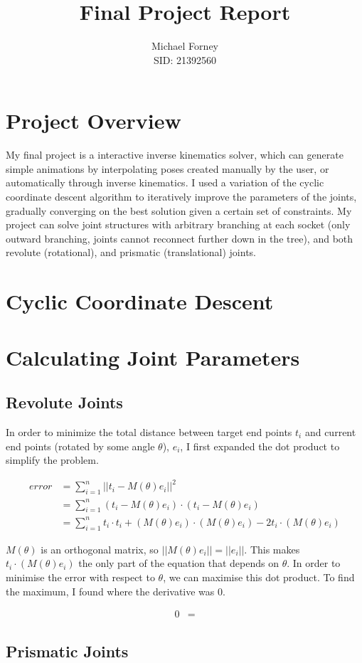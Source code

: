 \documentclass{article}
\title{Final Project Report}
\author{Michael Forney \\ SID: 21392560}
\begin{document}
    \maketitle
    \doublespacing

    \section{Project Overview}
    My final project is a interactive inverse kinematics solver, which can
    generate simple animations by interpolating poses created manually by the
    user, or automatically through inverse kinematics. I used a variation of the
    cyclic coordinate descent algorithm to iteratively improve the parameters of
    the joints, gradually converging on the best solution given a certain set of
    constraints. My project can solve joint structures with arbitrary branching
    at each socket (only outward branching, joints cannot reconnect further down
    in the tree), and both revolute (rotational), and prismatic (translational)
    joints.

    \section{Cyclic Coordinate Descent}

    \section{Calculating Joint Parameters}

    \subsection{Revolute Joints}
    In order to minimize the total distance between target end points $t_i$
    and current end points (rotated by some angle $\theta$), $e_i$, I first
    expanded the dot product to simplify the problem.

    \begin{align}
        error &= \sum_{i=1}^n ||t_i - M(\theta) e_i||^2 \\
              &= \sum_{i=1}^n (t_i - M(\theta) e_i) \cdot (t_i - M(\theta) e_i) \\
              &= \sum_{i=1}^n t_i \cdot t_i + (M(\theta) e_i) \cdot
                  (M(\theta) e_i) - 2 t_i \cdot (M(\theta) e_i)
    \end{align}

    \(M(\theta)\) is an orthogonal matrix, so \(||M(\theta) e_i|| = ||e_i||\).
    This makes \(t_i \cdot (M(\theta) e_i)\) the only part of the equation that
    depends on \(\theta\). In order to minimise the error with respect to
    $\theta$, we can maximise this dot product. To find the maximum, I found
    where the derivative was $0$.

    \begin{align}
        0 &= 
    \end{align}

    \subsection{Prismatic Joints}
\end{document}
